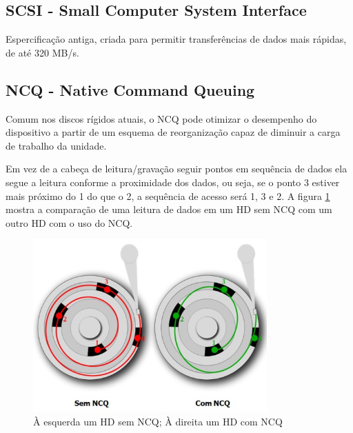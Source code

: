 \subsection{SCSI - Small Computer System Interface}

Espercificação antiga, criada para permitir transferências de dados mais rápidas, de até 320 MB/s.

\subsection{NCQ - Native Command Queuing}

Comum nos discos rígidos atuais, o NCQ pode otimizar o desempenho do dispositivo a partir de um esquema de reorganização capaz de diminuir a carga de trabalho da unidade.

Em vez de a cabeça de leitura/gravação seguir pontos em sequência de dados ela segue a leitura conforme a proximidade dos dados, ou seja, se o ponto 3 estiver mais próximo do 1 do que o 2, a sequência de acesso será 1, 3 e 2. A figura \ref{fig:ncq} mostra a comparação de uma leitura de dados em um HD sem NCQ com um outro HD com o uso do NCQ.

\begin{figure}[htb]
  \centering
  \includegraphics[width=0.8\textwidth]{hd/fig/ncq.jpg}
  \caption[Comparativo]{À esquerda um HD sem NCQ; À direita um HD com NCQ}
  \label{fig:ncq}
\end{figure}
